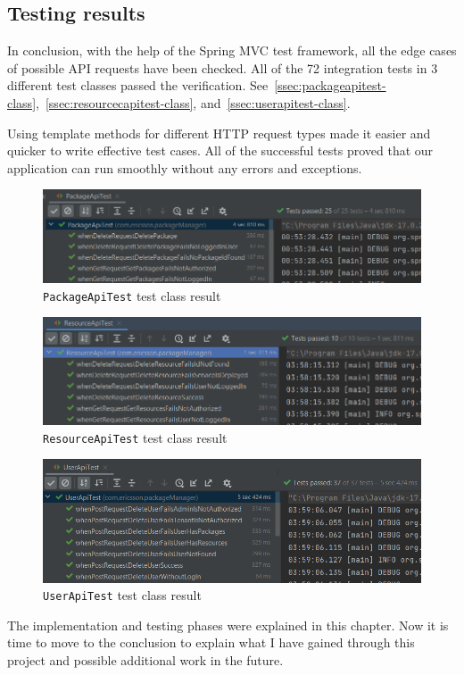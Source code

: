 \subsection{Testing results}

In conclusion, with the help of the Spring MVC test framework, all the edge cases of possible API requests have been checked. All of the 72 integration tests in 3 different test classes passed the verification. See~\autoref{ssec:packageapitest-class},~\autoref{ssec:resourcecapitest-class}, and~\autoref{ssec:userapitest-class}. 

Using template methods for different HTTP request types made it easier and quicker to write effective test cases. All of the successful tests proved that our application can run smoothly without any errors and exceptions.

\begin{figure}[H]
	\centering
	\includegraphics[width=150mm]{images/successful-tests.png}
	\caption{\texttt{PackageApiTest} test class result}
	\label{ssec:packageapitest-class}
\end{figure}

\begin{figure}[H]
	\centering
	\includegraphics[width=150mm]{images/resource-api-tests.png}
	\caption{\texttt{ResourceApiTest} test class result}
	\label{ssec:resourcecapitest-class}
\end{figure}

\begin{figure}[H]
	\centering
	\includegraphics[width=150mm]{images/user-api-tests.png}
	\caption{\texttt{UserApiTest} test class result}
	\label{ssec:userapitest-class}
\end{figure}

The implementation and testing phases were explained in this chapter. Now it is time to move to the conclusion to explain what I have gained through this project and possible additional work in the future.
